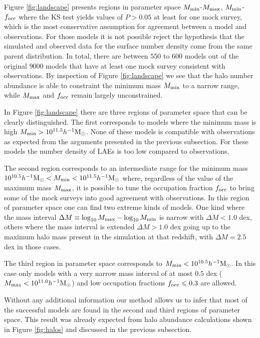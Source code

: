 \documentclass[usenatbib]{mn2e}
\newcommand{\hMsun}{{\ifmmode{h^{-1}{\rm
        {M_{\odot}}}}\else{$h^{-1}{\rm{M_{\odot}}}$}\fi}}
\begin{document}
Figure \ref{fig:landscape} presents regions in parameter space $M_{\rm
min}$-$M_{\rm max}$, $M_{\rm min}$-$f_{\rm occ}$ where the KS test yields
values of $P>0.05$ at least for one mock survey, which is the most
conservative assumption for agreement between a model and observations. For those models it
is not possible reject the hypothesis that the simulated and observed
data for the surface number density come from the same parent
distribution. In total, there are between $550$ to $600$ models out of
the original $9000$ models that have at least one mock survey
consistent with observations. By inspection of Figure
\ref{fig:landscape} we see that the halo number abundance is able to
constraint the minimum mass $M_{\rm min}$ to a narrow range, while
$M_{\rm max}$ and $f_{\rm occ}$ remain largely unconstrained.

In Figure \ref{fig:landscape} there are three regions of parameter
space that can be clearly distinguished. The first corresponds to
models where the minimum mass is high $M_{\rm min}>
10^{11.5}\hMsun$. None of these models is compatible with observations
as expected from the arguments presented in the previous
subsection. For these models the number density of LAEs is too low
compared to observations.

 
The second region corresponds to an intermediate range for the minimum
mass $10^{10.5}\hMsun < M_{\rm min}< 10^{11.5}\hMsun$ where,
regardless of the value of the maximum mass $M_{\rm max}$, it is
possible to tune the occupation fraction $f_{\rm occ}$ to bring some
of the mock surveys into good agreement with observations. In this
region of parameter space one can find two extreme kinds of models.
One kind where the mass interval $\Delta M\equiv \log_{10} M_{\rm max}
- \log_{10}M_{\rm  min}$ is narrow with $\Delta M<1.0$ dex, others
where the mass interval is  extended $\Delta M>1.0$ dex going up to
the maximum halo mass present in the simulation at that redshift, with
$\Delta M = 2.5$ dex in those cases.
 
The third region in parameter space corresponds to $M_{\rm
  min}<10^{10.5}\hMsun$. In this case only models with a very narrow
mass interval of at most $0.5$ dex ($M_{\rm max}<10^{11.0}\hMsun$) and low
occupation fractions $f_{\rm occ}\leq 0.3$ are allowed. 

Without any additional information our method allows us to infer that
most of the successful models are found in the second and third regions of
parameter space. This result was already expected from halo
abundance calculations shown in Figure \ref{fig:halos} and discussed
in the previous subsection. 
\end{document}
